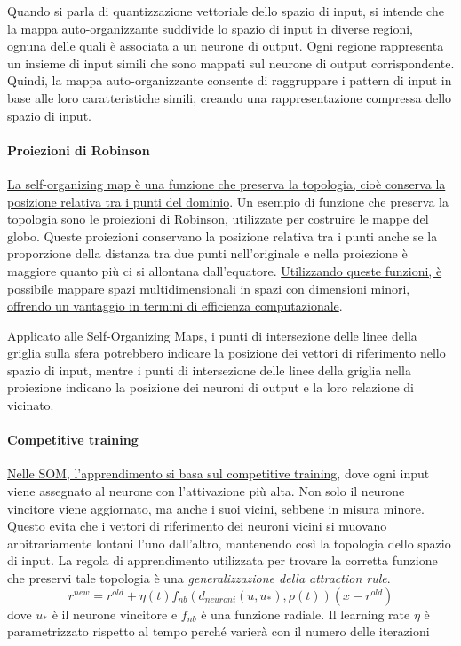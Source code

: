 Quando si parla di quantizzazione vettoriale dello spazio di input, si intende che la mappa auto-organizzante suddivide lo spazio di input in diverse regioni, ognuna delle quali è associata a un neurone di output. Ogni regione rappresenta un insieme di input simili che sono mappati sul neurone di output corrispondente. Quindi, la mappa auto-organizzante consente di raggruppare i pattern di input in base alle loro caratteristiche simili, creando una rappresentazione compressa dello spazio di input.

\paragraph{Proiezioni di Robinson}
\uline{La self-organizing map è una funzione che preserva la topologia, cioè conserva la posizione relativa tra i punti del dominio}. Un esempio di funzione che preserva la topologia sono le proiezioni di Robinson, utilizzate per costruire le mappe del globo. Queste proiezioni conservano la posizione relativa tra i punti anche se la proporzione della distanza tra due punti nell'originale e nella proiezione è maggiore quanto più ci si allontana dall'equatore. \uline{Utilizzando queste funzioni, è possibile mappare spazi multidimensionali in spazi con dimensioni minori, offrendo un vantaggio in termini di efficienza computazionale}.

Applicato alle Self-Organizing Maps, i punti di intersezione delle linee della griglia sulla sfera potrebbero indicare la posizione dei vettori di riferimento nello spazio di input, mentre i punti di intersezione delle linee della griglia nella proiezione indicano la posizione dei neuroni di output e la loro relazione di vicinato.

\paragraph{Competitive training}
\uline{Nelle SOM, l'apprendimento si basa sul competitive training}, dove ogni input viene assegnato al neurone con l'attivazione più alta. Non solo il neurone vincitore viene aggiornato, ma anche i suoi vicini, sebbene in misura minore. Questo evita che i vettori di riferimento dei neuroni vicini si muovano arbitrariamente lontani l'uno dall'altro, mantenendo così la topologia dello spazio di input. La regola di apprendimento utilizzata per trovare la corretta funzione che preservi tale topologia è una \textit{generalizzazione della attraction rule}.
$$r^{new} = r^{old} + \eta(t)f_{nb}(d_{neuroni}(u,u_*),\rho(t))(x - r^{old})$$
dove $u_*$ è il neurone vincitore e $f_{nb}$ è una funzione radiale. Il learning rate $\eta$ è parametrizzato rispetto al tempo perché varierà con il numero delle iterazioni


